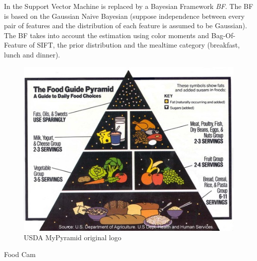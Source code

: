 In \cite{Aizawa2013} the Support Vector Machine is replaced by a Bayesian Framework \textit{BF}.
The BF is based on the Gaussian Naive Bayesian (suppose independence between every pair of features and the distribution of each feature is assumed to be Gaussian). The BF takes into account the estimation using color moments and Bag-Of-Feature of SIFT, the prior distribution and the mealtime category (breakfast, lunch and dinner).

\begin{figure}
    \centering
    \includegraphics[scale=0.8]{img/my_pyramid.jpg}
    \caption{USDA MyPyramid original logo}
    \label{fig:my_pyramid}
\end{figure}

Food Cam